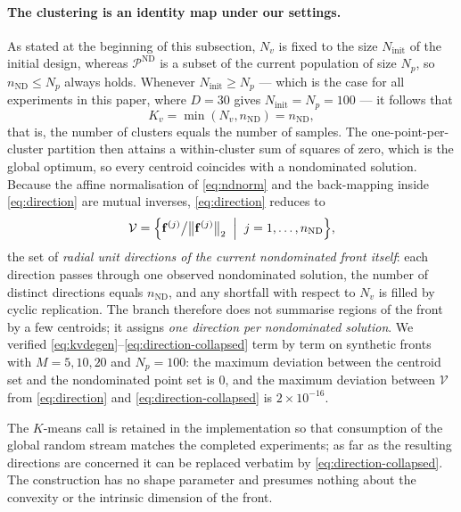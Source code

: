 \documentclass[11pt,a4paper]{article}
\newcommand{\vf}{\mathbf{f}}
\begin{document}
\paragraph{The clustering is an identity map under our settings.}
As stated at the beginning of this subsection, $N_v$ is fixed to the size
$N_{\mathrm{init}}$ of the initial design, whereas $\mathcal{P}^{\mathrm{ND}}$ is
a subset of the current population of size $N_p$, so $n_{\mathrm{ND}}\leq N_p$
always holds. Whenever $N_{\mathrm{init}}\geq N_p$ --- which is the case for all
experiments in this paper, where $D=30$ gives $N_{\mathrm{init}}=N_p=100$ ---
it follows that
\begin{equation}
K_v=\min(N_v,n_{\mathrm{ND}})=n_{\mathrm{ND}},
\label{eq:kvdegen}
\end{equation}
that is, the number of clusters equals the number of samples. The one-point-per-cluster
partition then attains a within-cluster sum of squares of zero, which is the global
optimum, so every centroid coincides with a nondominated solution. Because the affine
normalisation of \eqref{eq:ndnorm} and the back-mapping inside \eqref{eq:direction} are
mutual inverses, \eqref{eq:direction} reduces to
\begin{equation}
\mathcal{V}=\Bigl\{\vf^{(j)}\big/\bigl\|\vf^{(j)}\bigr\|_2
\;\Bigm|\;j=1,\ldots,n_{\mathrm{ND}}\Bigr\},
\label{eq:direction-collapsed}
\end{equation}
the set of \emph{radial unit directions of the current nondominated front itself}:
each direction passes through one observed nondominated solution, the number of
distinct directions equals $n_{\mathrm{ND}}$, and any shortfall with respect to
$N_v$ is filled by cyclic replication. The branch therefore does not summarise
regions of the front by a few centroids; it assigns \emph{one direction per
nondominated solution}. We verified \eqref{eq:kvdegen}--\eqref{eq:direction-collapsed}
term by term on synthetic fronts with $M=5,10,20$ and $N_p=100$: the maximum
deviation between the centroid set and the nondominated point set is $0$, and the
maximum deviation between $\mathcal{V}$ from \eqref{eq:direction} and
\eqref{eq:direction-collapsed} is $2\times10^{-16}$.

The $K$-means call is retained in the implementation so that consumption of the
global random stream matches the completed experiments; as far as the resulting
directions are concerned it can be replaced verbatim by
\eqref{eq:direction-collapsed}. The construction has no shape parameter and
presumes nothing about the convexity or the intrinsic dimension of the front.
\end{document}
